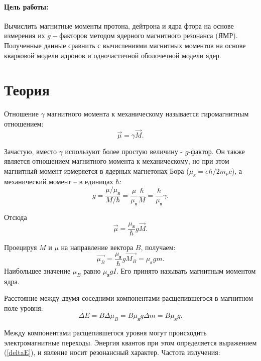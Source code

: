 \documentclass{physlab}
\begin{document}


\paragraph{Цель работы:} Вычислить магнитные моменты протона, дейтрона и ядра фтора на основе измерения их $g-$факторов методом ядерного магнитного резонанса (ЯМР). Полученные данные сравнить с вычислениями магнитных моментов на основе кварковой модели адронов и одночастичной оболочечной модели  ядер.
	

\section{Теория}
Отношение $\gamma$ магнитного момента к механическому называется гиромагнитным отношением:
\begin{equation}
\vec{\mu} = \gamma \vec{M}.
\end{equation}

Зачастую, вместо $\gamma$ используют более простую величину - $g$-фактор. Он также является отношением магнитного момента к механическому, но при этом магнитный момент измеряется в ядерных магнетонах Бора ($\mu_\text{я} = e \hbar / 2 m_p c$), а механический момент -- в единицах $\hbar$:
\begin{equation}
g = \frac{\mu / \mu _\text{я}}{M/\hbar} = \frac{\mu}{\mu_\text{я}} \frac{\hbar}{M} = \frac{\hbar}{\mu_\text{я}} \gamma.
\end{equation}

Отсюда 
\begin{equation} \label{mu}
\vec{\mu} = \frac{\mu_\text{я}}{\hbar} g \vec{M}.
\end{equation}


Проецируя $M$ и $\mu$ на направление вектора $B$, получаем:
\begin{equation}
\vec{\mu_B} = \frac{\mu_\text{я}}{\hbar} g \vec{M_B} = \mu_\text{я} g m.
\end{equation}
Наибольшее значение $\mu_B$ равно $\mu_\text{я} g I$. Его принято называть магнитным моментом ядра. 

Расстояние между двумя соседними компонентами расщепившегося в магнитном поле уровня:
\begin{equation} \label{deltaE}
\Delta E = B \Delta \mu_B = B \mu_\text{я} g \Delta m = B \mu_\text{я} g.
\end{equation}

Между компонентами расщепившегося уровня могут происходить электромагнитные переходы. Энергия квантов при этом определяется выражением (\ref{deltaE}), и явление носит резонансный характер. Частота излучения:
\end{document}
